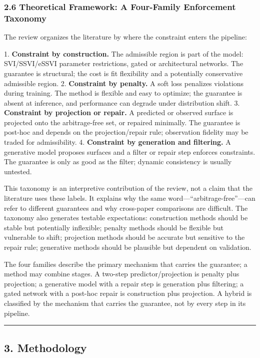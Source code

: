 \documentclass[11pt]{article}
\begin{document}
\subsubsection*{2.6 Theoretical Framework: A Four-Family Enforcement Taxonomy}
The review organizes the literature by where the constraint enters the pipeline:

1. \textbf{Constraint by construction.} The admissible region is part of the model: SVI/SSVI/eSSVI parameter restrictions, gated or architectural networks. The guarantee is structural; the cost is fit flexibility and a potentially conservative admissible region. 2. \textbf{Constraint by penalty.} A soft loss penalizes violations during training. The method is flexible and easy to optimize; the guarantee is absent at inference, and performance can degrade under distribution shift. 3. \textbf{Constraint by projection or repair.} A predicted or observed surface is projected onto the arbitrage-free set, or repaired minimally. The guarantee is post-hoc and depends on the projection/repair rule; observation fidelity may be traded for admissibility. 4. \textbf{Constraint by generation and filtering.} A generative model proposes surfaces and a filter or repair step enforces constraints. The guarantee is only as good as the filter; dynamic consistency is usually untested.

This taxonomy is an interpretive contribution of the review, not a claim that the literature uses these labels. It explains why the same word—“arbitrage-free”—can refer to different guarantees and why cross-paper comparisons are difficult. The taxonomy also generates testable expectations: construction methods should be stable but potentially inflexible; penalty methods should be flexible but vulnerable to shift; projection methods should be accurate but sensitive to the repair rule; generative methods should be plausible but dependent on validation.

The four families describe the primary mechanism that carries the guarantee; a method may combine stages. A two-step predictor/projection is penalty plus projection; a generative model with a repair step is generation plus filtering; a gated network with a post-hoc repair is construction plus projection. A hybrid is classified by the mechanism that carries the guarantee, not by every step in its pipeline.

\par\medskip\hrule\medskip
\subsection*{3. Methodology}
\end{document}
